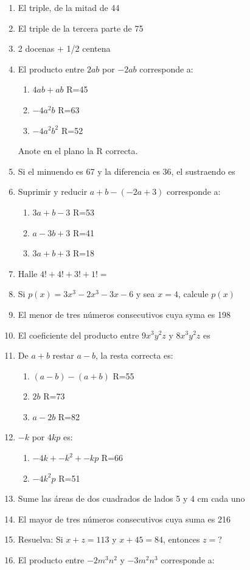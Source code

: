 \documentclass[letterpaper,11pt,twoside]{article}
\begin{document}
\begin{multicols}{2}
\begin{enumerate}
\item El triple, de la mitad de 44
\item El triple de la tercera parte de 75
\item 2 docenas + 1/2 centena
\item El producto entre $2ab$ por $-2ab$ corresponde a:
\begin{enumerate}
\item $4ab+ab$ \; R=45
\item $-4a^{2}b$  \; R=63
\item $-4a^{2}b^{2}$ \; R=52
\end{enumerate}
Anote en el plano la R correcta.
\item Si el minuendo es 67 y la diferencia es 36, el sustraendo es
\item Suprimir y reducir $a+b-(-2a+3)$ corresponde a:
\begin{enumerate}
\item $3a+b-3$ \; R=53
\item $a-3b+3$ \; R=41
\item $3a+b+3$ \; R=18
\end{enumerate}
\item Halle $4!+4!+3!+1!=$
\item Si $p(x)=3x^{3}-2x^{3}-3x-6$ y sea $x=4$, calcule $p(x)$
\item El menor de tres números consecutivos cuya syma es 198
\item El coeficiente del producto entre $9x^{3}y^{2}z$ y $8x^{3}y^{2}z$ es
\item De $a+b$ restar $a-b$, la resta correcta es:
\begin{enumerate}
\item $(a-b)-(a+b)$ \; R=55
\item $2b$ \; R=73
\item $a-2b$ \; R=82
\end{enumerate}
\item $-k$ por $4kp$ es:
\begin{enumerate}
\item $-4k+-k^{2}+-kp$ \; R=66
\item $-4k^{2}p$ \; R=51
\end{enumerate}
\item Sume las áreas de dos cuadrados de lados 5 y 4 cm cada uno
\item El mayor de tres números consecutivos cuya suma es 216
\item Resuelva: Si $x+z=113$ y $x+45=84$, entonces $z=$?
\item El producto entre $-2m^{3}n^{2}$ y $-3m^{2}n^{3}$ corresponde a:

\end{enumerate}
\end{multicols}
\end{document}
